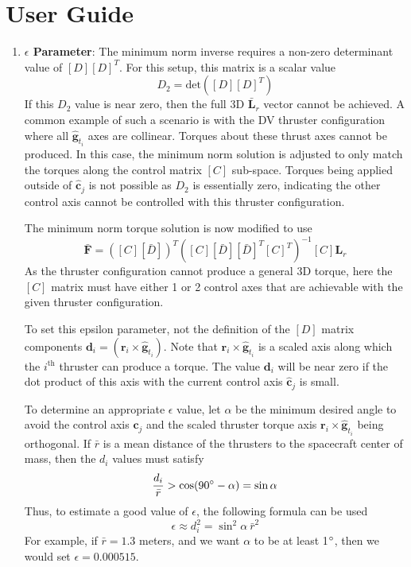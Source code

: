 
\section{User Guide}
\begin{enumerate}


\item \textbf{$\epsilon$ Parameter}: The minimum norm inverse requires a non-zero determinant value of $[D][D]^{T}$.  For this setup, this matrix is a scalar value
\begin{equation}
	D_{2} = \text{det}([D][D]^{T})
\end{equation}
If this $D_{2}$ value is near zero, then the full 3D $\bar{\bm L}_{r}$ vector cannot be achieved.  A common example of such a scenario is with the DV thruster configuration where all $\hat{\bm g}_{t_{i}}$ axes are collinear.  Torques about these thrust axes cannot be produced.  In this case, the minimum norm solution is adjusted to only match the torques along the control matrix $[C]$ sub-space.  Torques being applied outside of $\hat{\bm c}_{j}$ is not possible as $D_{2}$ is essentially zero, indicating the other control axis cannot be controlled with this thruster configuration.  

The minimum norm torque solution is now modified to use
\begin{equation}
	\bar{\bm F} = ([C][\bar D])^{T}( [C][\bar D][\bar D]^{T}[C]^{T})^{-1} [C] {\bm L}_{r}
\end{equation}
As the thruster configuration cannot produce a general 3D torque, here the $[C]$ matrix must have either 1 or 2 control axes that are achievable with the given thruster configuration.  

To set this epsilon parameter, not the definition of the $[D]$ matrix components $\bm d_{i} = (\bm r_{i} \times \hat{\bm g}_{t_{i}})$. Note that $\bm r_{i} \times \hat{\bm g}_{t_{i}}$ is a scaled axis along which the $i^{\text{th}}$ thruster can produce a torque.  The value $\bm d_{i}$ will be near zero if the dot product of this axis with the current control axis $\hat{\bm c}_{j}$ is small.  

To determine an appropriate $\epsilon$ value, let $\alpha$ be the minimum desired angle to avoid the control axis $\hat{\bm c}_{j}$ and the scaled thruster torque axis $\bm r_{i} \times \hat{\bm g}_{t_{i}}$ being orthogonal.  If $\bar r$ is a mean distance of the thrusters to the spacecraft center of mass, then the $d_{i}$ values must satisfy
\begin{equation}
	\frac{d_{i}}{\bar r} > \cos(90\dg - \alpha) = \sin\alpha
\end{equation}
Thus, to estimate a good value of $\epsilon$, the following formula can be used
\begin{equation}
	\epsilon \approx d_{i}^{2} = \sin^{2}\!\alpha \ \bar{r}^{2}
\end{equation}
For example, if $\bar{r} = 1.3$ meters, and we want $\alpha$ to be at least 1$\dg$, then we would set $\epsilon = 0.000515$.


\end{enumerate}
